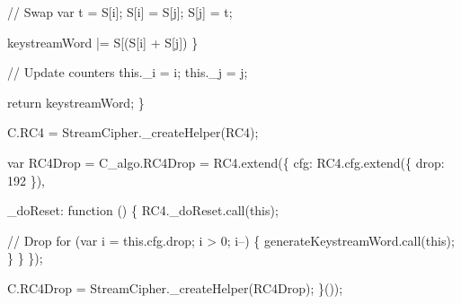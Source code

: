 \begin{DoxyCodeInclude}
            \textcolor{comment}{// Swap}
            var t = S[i];
            S[i] = S[j];
            S[j] = t;

            keystreamWord |= S[(S[i] + S[j]) %
        \}

        \textcolor{comment}{// Update counters}
        this.\_i = i;
        this.\_j = j;

        \textcolor{keywordflow}{return} keystreamWord;
    \}

    C.RC4 = StreamCipher.\_createHelper(RC4);

    var RC4Drop = C\_algo.RC4Drop = RC4.extend(\{
        cfg: RC4.cfg.extend(\{
            drop: 192
        \}),

        \_doReset: \textcolor{keyword}{function} () \{
            RC4.\_doReset.call(\textcolor{keyword}{this});

            \textcolor{comment}{// Drop}
            \textcolor{keywordflow}{for} (var i = this.cfg.drop; i > 0; i--) \{
                generateKeystreamWord.call(\textcolor{keyword}{this});
            \}
        \}
    \});

    C.RC4Drop = StreamCipher.\_createHelper(RC4Drop);
\}());
\end{DoxyCodeInclude}
 